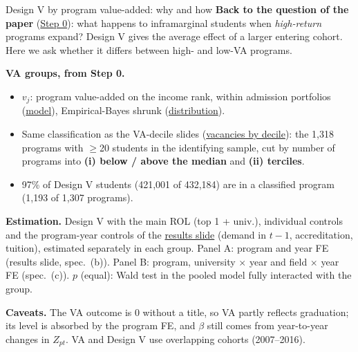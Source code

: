 \documentclass{beamer}
\begin{document}
\begin{frame}[label=d5-va-intro]{Design V by program value-added: why and how}
\footnotesize
\textbf{Back to the question of the paper} (\hyperlink{va-why}{\color{blue}Step 0}): what happens to inframarginal students when \emph{high-return} programs expand?
Design V gives the average effect of a larger entering cohort. Here we ask whether it differs between high- and low-VA programs.

\vspace{0.15cm}
\textbf{VA groups, from Step 0.}
\begin{itemize}
    \setlength{\itemsep}{2pt}
    \item $v_j$: program value-added on the income rank, within admission portfolios (\hyperlink{va-model}{\color{blue}model}), Empirical-Bayes shrunk (\hyperlink{va-dist}{\color{blue}distribution}).
    \item Same classification as the VA-decile slides (\hyperlink{va-vacancies}{\color{blue}vacancies by decile}): the 1,318 programs with $\geq$20 students in the identifying sample, cut by number of programs into \textbf{(i) below / above the median} and \textbf{(ii) terciles}.
    \item 97\% of Design V students (421,001 of 432,184) are in a classified program (1,193 of 1,307 programs).
\end{itemize}

\vspace{0.15cm}
\textbf{Estimation.} Design V with the main ROL (top 1 + univ.), individual controls and the program-year controls of the \hyperlink{d5-results}{\color{blue}results slide} (demand in $t-1$, accreditation, tuition), estimated separately in each group. Panel A: program and year FE (results slide, spec.\ (b)). Panel B: program, university $\times$ year and field $\times$ year FE (spec.\ (c)).
$p$ (equal): Wald test in the pooled model fully interacted with the group.

\vspace{0.15cm}
\footnotesize
\textbf{Caveats.} The VA outcome is 0 without a title, so VA partly reflects graduation; its level is absorbed by the program FE, and $\beta$ still comes from year-to-year changes in $Z_{pt}$. VA and Design V use overlapping cohorts (2007--2016).
\end{frame}
\end{document}

